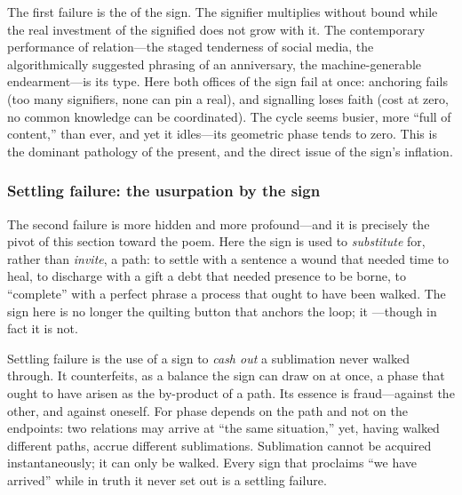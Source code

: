 The first failure is the  of the sign. The signifier multiplies without bound while the real investment of the signified does not grow with it. The contemporary performance of relation---the staged tenderness of social media, the algorithmically suggested phrasing of an anniversary, the machine-generable endearment---is its type. Here both offices of the sign fail at once: anchoring fails (too many signifiers, none can pin a real), and signalling loses faith (cost at zero, no common knowledge can be coordinated). The cycle seems busier, more ``full of content,'' than ever, and yet it idles---its geometric phase tends to zero. This is the dominant pathology of the present, and the direct issue of the sign's inflation.

\subsubsection{Settling failure: the usurpation by the sign}

The second failure is more hidden and more profound---and it is precisely the pivot of this section toward the poem. Here the sign is used to \emph{substitute} for, rather than \emph{invite}, a path: to settle with a sentence a wound that needed time to heal, to discharge with a gift a debt that needed presence to be borne, to ``complete'' with a perfect phrase a process that ought to have been walked. The sign here is no longer the quilting button that anchors the loop; it ---though in fact it is not.

\begin{claim}
Settling failure is the use of a sign to \emph{cash out} a sublimation never walked through. It counterfeits, as a balance the sign can draw on at once, a phase that ought to have arisen as the by-product of a path. Its essence is fraud---against the other, and against oneself. For phase depends on the path and not on the endpoints: two relations may arrive at ``the same situation,'' yet, having walked different paths, accrue different sublimations. Sublimation cannot be acquired instantaneously; it can only be walked. Every sign that proclaims ``we have arrived'' while in truth it never set out is a settling failure.
\end{claim}

